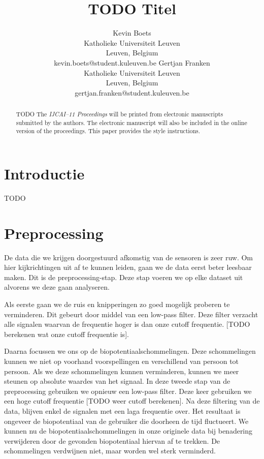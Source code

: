 \documentclass{article}
\title{TODO Titel}
\author{Kevin Boets \\ Katholieke Universiteit Leuven\\ Leuven, Belgium \\ kevin.boets@student.kuleuven.be
\And
Gertjan Franken \\ Katholieke Universiteit Leuven\\ Leuven, Belgium \\ gertjan.franken@student.kuleuven.be}
\begin{document}
\maketitle

\begin{abstract}
 TODO
  The {\it IJCAI--11 Proceedings} will be printed from electronic
  manuscripts submitted by the authors. The electronic manuscript will
  also be included in the online version of the proceedings. This paper
  provides the style instructions.
\end{abstract}

\section{Introductie}

TODO 

\section{Preprocessing}

De data die we krijgen doorgestuurd afkomstig van de sensoren is zeer ruw. Om hier kijkrichtingen uit af te kunnen leiden, gaan we de data eerst beter leesbaar maken. Dit is de preprocessing-stap. Deze stap voeren we op elke dataset uit alvorens we deze gaan analyseren.

Als eerste gaan we de ruis en knipperingen zo goed mogelijk proberen te verminderen. Dit gebeurt door middel van een low-pass filter. Deze filter verzacht alle signalen waarvan de frequentie hoger is dan onze cutoff frequentie. [TODO berekenen wat onze cutoff frequentie is].

Daarna focussen we ons op de biopotentiaalschommelingen. Deze schommelingen kunnen we niet op voorhand voorspellingen en verschillend van persoon tot persoon. Als we deze schommelingen kunnen verminderen, kunnen we meer steunen op absolute waardes van het signaal. In deze tweede stap van de preprocessing gebruiken we opnieuw een low-pass filter. Deze keer gebruiken we een hoge cutoff frequentie [TODO weer cutoff berekenen]. Na deze filtering van de data, blijven enkel de signalen met een laga frequentie over. Het resultaat is ongeveer de biopotentiaal van de gebruiker die doorheen de tijd fluctueert. We kunnen nu de biopotentiaalschommelingen in onze originele data bij benadering verwijderen door de gevonden biopotentiaal hiervan af te trekken. De schommelingen verdwijnen niet, maar worden wel sterk verminderd.
\end{document}
